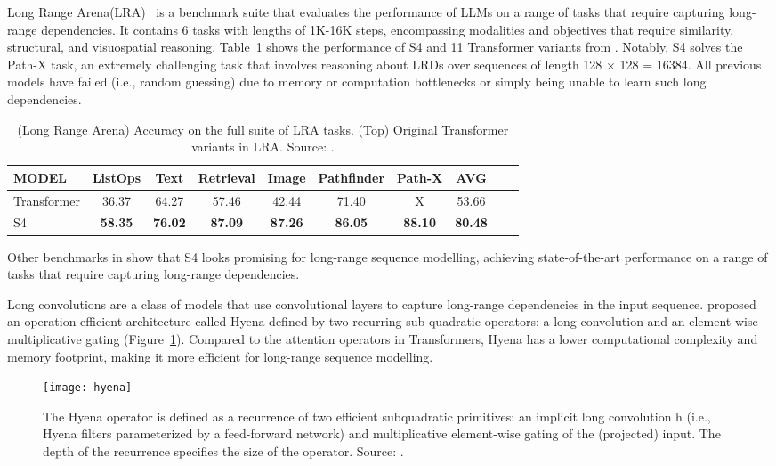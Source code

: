 Long Range Arena(LRA)~\cite{tay2021longrange} is a benchmark suite that evaluates the performance of LLMs on a range of tasks that require capturing long-range dependencies.
It contains 6 tasks with lengths of 1K-16K steps, encompassing modalities and objectives that require similarity, structural, and visuospatial reasoning.
Table~\ref{tab:LRA} shows the performance of S4 and 11 Transformer variants from \textcite{tay2021longrange}.
Notably, S4 solves the Path-X task, an extremely challenging task that involves reasoning about LRDs over sequences of length 128 × 128 = 16384.
All previous models have failed (i.e., random guessing) due to memory or computation bottlenecks or simply being unable to learn such long dependencies.
\begin{table}[htbp]
	\centering
	\begin{tabularx}{\textwidth}{Xccccccccc}
		\toprule
		MODEL       & ListOps        & Text           & Retrieval      & Image          & Pathfinder     & Path-X         & AVG            \\
		\midrule
		Transformer & 36.37          & 64.27          & 57.46          & 42.44          & 71.40          & X              & 53.66          \\
		\addlinespace
		S4          & \textbf{58.35} & \textbf{76.02} & \textbf{87.09} & \textbf{87.26} & \textbf{86.05} & \textbf{88.10} & \textbf{80.48} \\
		\bottomrule
	\end{tabularx}
	\caption{(Long Range Arena) Accuracy on the full suite of LRA tasks. (Top) Original Transformer variants in LRA. Source: \textcite{gu2022efficiently}.}
	\label{tab:LRA}
\end{table}
Other benchmarks in \textcite{gu2022efficiently} show that S4 looks promising for long-range sequence modelling, achieving state-of-the-art performance on a range of tasks that require capturing long-range dependencies.

Long convolutions are a class of models that use convolutional layers to capture long-range dependencies in the input sequence. \textcite{poli2023hyena} proposed an operation-efficient architecture called Hyena defined by two recurring sub-quadratic operators: a long convolution and an element-wise multiplicative gating (Figure~\ref{fig:hyena}).
Compared to the attention operators in Transformers, Hyena has a lower computational complexity and memory footprint, making it more efficient for long-range sequence modelling.

\begin{figure}[h]
	\centering
	\texttt{[image: hyena]}
	\caption{The Hyena operator is defined as a recurrence of two efficient subquadratic primitives: an implicit long convolution h (i.e., Hyena filters parameterized by a feed-forward network) and multiplicative element-wise gating of the (projected) input. The depth of the recurrence specifies the size of the operator. Source: \textcite{poli2023hyena}.}
	\label{fig:hyena}
\end{figure}

